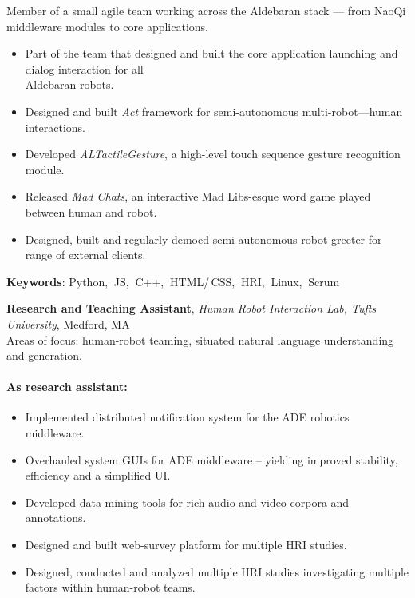 \documentclass[10pt, letter]{article}
\newcommand{\years}[1]{\marginnote{\footnotesize #1}}
\newenvironment{desc*}{
  \begin{description}
    \setlength{\itemsep}{0.2pt}
    \setlength{\parskip}{-1pt}
    \setlength{\parsep}{0pt}
  }{
  \end{description}
}
\begin{document}
\vspace{-.3cm} 
Member of a small agile team working across the Aldebaran stack --- from NaoQi middleware modules to core applications.
\begin{itemize}[leftmargin=*, parsep=-1pt]
\item Part of the team that designed and built the core
  application launching and dialog interaction for all\\
  Aldebaran robots.
\item Designed and built \textit{Act} framework for semi-autonomous
  multi-robot---human interactions.
\item Developed \textit{ALTactileGesture}, a high-level touch sequence
  gesture recognition module.
\item Released \textit{Mad Chats}, an interactive Mad Libs-esque word
  game played between human and robot.
\item Designed, built and regularly demoed semi-autonomous robot
  greeter for range of external clients.
\end{itemize}
\vspace{-.2cm}
\begin{desc*}
\item[\rm \color{redblue} \textbf{Keywords}:] Python,$\:$ JS,$\:$ C++,$\:$ HTML/\,CSS,$\:$
  HRI,$\:$ Linux,$\:$ Scrum\\
\end{desc*}

\vspace{-.2cm}
\years{2012 - 2014} 
\textbf{\fontsize{10.5pt}{1em}\selectfont Research and Teaching Assistant}, 
\textit{Human Robot Interaction Lab, Tufts University}, Medford, MA\\ 

\vspace{-.3cm} 
Areas of focus: human-robot teaming, situated natural language understanding and generation. 

\vspace{-.3cm} 
\paragraph{\textbf{As research assistant:}}
\begin{itemize}[leftmargin=*, parsep=-1pt]
\item Implemented distributed notification system for the ADE robotics
  middleware. 
\item Overhauled system GUIs for ADE middleware -- yielding improved
  stability, efficiency and a simplified UI. 
\item Developed data-mining tools for rich audio and video corpora and annotations. 
\item Designed and built web-survey platform for multiple HRI studies. 
\item Designed, conducted and analyzed multiple HRI studies
  investigating multiple factors within human-robot teams.
\end{itemize}
\vspace{-.5cm} 
\end{document}
